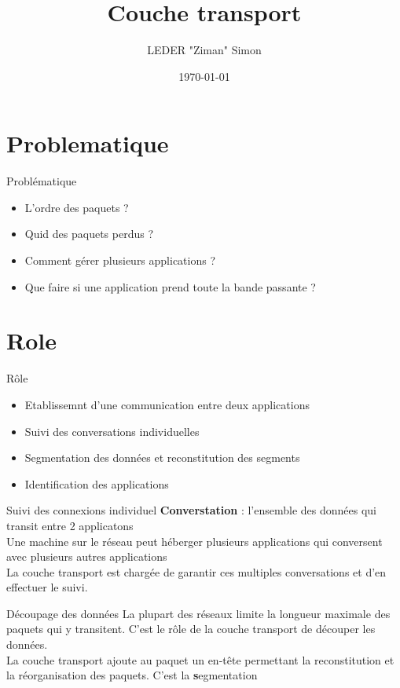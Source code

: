 \documentclass{beamer}
\title{Couche transport}
\author{LEDER "Ziman" Simon}
\institute{Rezoleo\\}
\date{\today}
\begin{document}
	
	\begin{frame}
		\titlepage
	\end{frame}

\section{Problematique}
	
	\begin{frame}{Problématique}
		\begin{itemize}
			\item[\textbullet] L'ordre des paquets ?
			\item[\textbullet] Quid des paquets perdus ?
			\item[\textbullet] Comment gérer plusieurs applications ?
			\item[\textbullet] Que faire si une application prend toute la bande passante ?
		\end{itemize}
	\end{frame}

\section{Role}

	\begin{frame}{Rôle}
		\begin{itemize}
			\item[\textbullet] Etablissemnt d'une communication entre deux applications
			\item[\textbullet] Suivi des conversations individuelles 
			\item[\textbullet] Segmentation des données et reconstitution des segments
			\item[\textbullet] Identification des applications
		\end{itemize}
	\end{frame}

	\begin{frame}{Suivi des connexions individuel}
		\textbf{Converstation} : l'ensemble des données qui transit entre 2 applicatons \\
		Une machine sur le réseau peut héberger plusieurs applications qui conversent avec plusieurs autres applications\\
		La couche transport est chargée de garantir ces multiples conversations et d'en effectuer le suivi.
	\end{frame}


	\begin{frame}{Découpage des données}
		La plupart des réseaux limite la longueur maximale des paquets qui y transitent. C'est le rôle de la couche transport de découper les données.\\
		La couche transport ajoute au paquet un en-tête permettant la reconstitution et la réorganisation des paquets. C'est la {\textbf segmentation}\\
	\end{frame}
\end{document}
